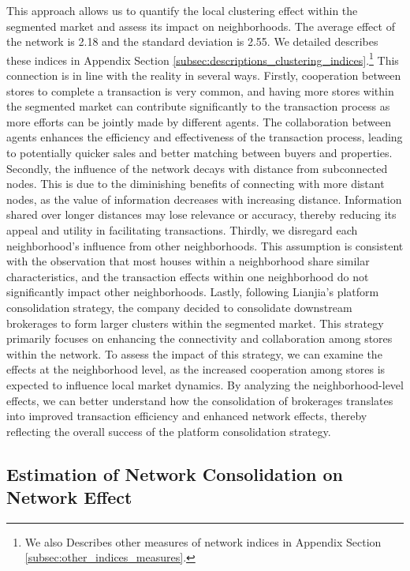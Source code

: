 \documentclass[11pt]{article}
\begin{document}
This approach allows us to quantify the local clustering effect within the segmented market and assess its impact on neighborhoods. The average effect of the network is 2.18 and the standard deviation is 2.55. We detailed describes these indices in Appendix Section \ref{subsec:descriptions_clustering_indices}.\footnote{We also Describes other measures of network indices in Appendix Section \ref{subsec:other_indices_measures}.} This connection is in line with the reality in several ways. Firstly, cooperation between stores to complete a transaction is very common, and having more stores within the segmented market can contribute significantly to the transaction process as more efforts can be jointly made by different agents. The collaboration between agents enhances the efficiency and effectiveness of the transaction process, leading to potentially quicker sales and better matching between buyers and properties. Secondly, the influence of the network decays with distance from subconnected nodes. This is due to the diminishing benefits of connecting with more distant nodes, as the value of information decreases with increasing distance. Information shared over longer distances may lose relevance or accuracy, thereby reducing its appeal and utility in facilitating transactions. Thirdly, we disregard each neighborhood's influence from other neighborhoods. This assumption is consistent with the observation that most houses within a neighborhood share similar characteristics, and the transaction effects within one neighborhood do not significantly impact other neighborhoods. Lastly, following Lianjia's platform consolidation strategy, the company decided to consolidate downstream brokerages to form larger clusters within the segmented market. This strategy primarily focuses on enhancing the connectivity and collaboration among stores within the network. To assess the impact of this strategy, we can examine the effects at the neighborhood level, as the increased cooperation among stores is expected to influence local market dynamics. By analyzing the neighborhood-level effects, we can better understand how the consolidation of brokerages translates into improved transaction efficiency and enhanced network effects, thereby reflecting the overall success of the platform consolidation strategy.

\subsection{Estimation of Network Consolidation on Network Effect} \label{subsec:platform_network_effect}
\end{document}
